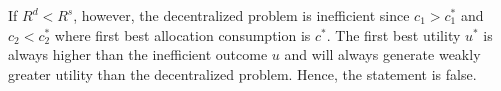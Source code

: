 \documentclass[12pt]{article}
\begin{document}
\begin{enumerate}
\begin{enumerate}
        If $R^d<R^s$, however, the decentralized problem is inefficient since $c_1>c_1^*$ and $c_2<c_2^*$ where first best allocation consumption is $c^*$. The first best utility $u^*$ is always higher than the inefficient outcome $u$ and will always generate weakly greater utility than the decentralized problem.
        Hence, the statement is false. 

        

\end{enumerate}
\end{enumerate}
\end{document}
